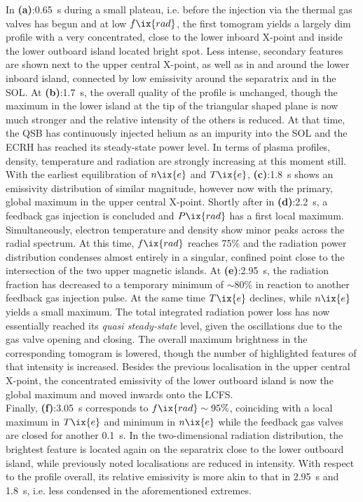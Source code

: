            In \textbf{(a)}:\SI{0.65}{\second} during a small plateau, i.e. before the injection via the thermal gas valves has begun and at low $f\ix{rad}$, the first tomogram yields a largely dim profile with a very concentrated, close to the lower inboard X-point and inside the lower outboard island located bright spot. Less intense, secondary features are shown next to the upper central X-point, as well as in and around the lower inboard island, connected by low emissivity around the separatrix and in the SOL. At \textbf{(b)}:\SI{1.7}{\second}, the overall quality of the profile is unchanged, though the maximum in the lower island at the tip of the triangular shaped plane is now much stronger and the relative intensity of the others is reduced. At that time, the QSB has continuously injected helium as an impurity into the SOL and the ECRH has reached its steady-state power level. In terms of plasma profiles, density, temperature and radiation are strongly increasing at this moment still.\\%
            With the earliest equilibration of $n\ix{e}$ and $T\ix{e}$, \textbf{(c)}:\SI{1.8}{\second} shows an emissivity distribution of similar magnitude, however now with the primary, global maximum in the upper central X-point. Shortly after in \textbf{(d)}:\SI{2.2}{\second}, a feedback gas injection is concluded and $P\ix{rad}$ has a first local maximum. Simultaneously, electron temperature and density show minor peaks across the radial spectrum. At this time, $f\ix{rad}$ reaches 75\% and the radiation power distribution condenses almost entirely in a singular, confined point close to the intersection of the two upper magnetic islands. At \textbf{(e)}:\SI{2.95}{\second}, the radiation fraction has decreased to a temporary minimum of $\sim80\%$ in reaction to another feedback gas injection pulse. At the same time $T\ix{e}$ declines, while $n\ix{e}$ yields a small maximum. The total integrated radiation power loss has now essentially reached its \textit{quasi steady-state} level, given the oscillations due to the gas valve opening and closing. The overall maximum brightness in the corresponding tomogram is lowered, though the number of highlighted features of that intensity is increased. Besides the previous localisation in the upper central X-point, the concentrated emissivity of the lower outboard island is now the global maximum and moved inwards onto the LCFS.\\%
            Finally, \textbf{(f)}:\SI{3.05}{\second} corresponds to $f\ix{rad}\sim95\%$, coinciding with a local maximum in $T\ix{e}$ and minimum in $n\ix{e}$ while the feedback gas valves are closed for another \SI{0.1}{\second}. In the two-dimensional radiation distribution, the brightest feature is located again on the separatrix close to the lower outboard island, while previously noted localisations are reduced in intensity. With respect to the profile overall, its relative emissivity is more akin to that in \SI{2.95}{\second} and \SI{1.8}{\second}, i.e. less condensed in the aforementioned extremes.\\%
